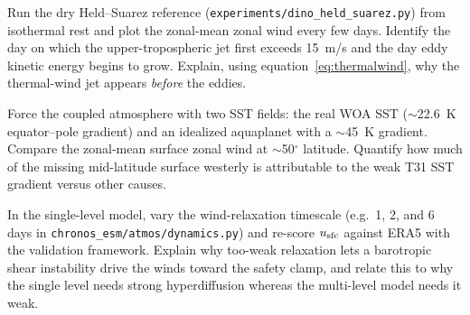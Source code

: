\begin{exercise}
Run the dry Held--Suarez reference (\texttt{experiments/dino\_held\_suarez.py}) from isothermal
rest and plot the zonal-mean zonal wind every few days. Identify the day on which the
upper-tropospheric jet first exceeds 15~m/s and the day eddy kinetic energy begins to grow.
Explain, using equation~\eqref{eq:thermalwind}, why the thermal-wind jet appears \emph{before}
the eddies.
\end{exercise}

\begin{exercise}
Force the coupled \dino{} atmosphere with two SST fields: the real WOA SST ($\sim$22.6~K
equator--pole gradient) and an idealized aquaplanet with a $\sim$45~K gradient. Compare the
zonal-mean surface zonal wind at $\sim$50$^\circ$ latitude. Quantify how much of the missing
mid-latitude surface westerly is attributable to the weak T31 SST gradient versus other causes.
\end{exercise}

\begin{exercise}
In the single-level model, vary the wind-relaxation timescale (e.g.\ 1, 2, and 6 days in
\texttt{chronos\_esm/atmos/dynamics.py}) and re-score $u_{\mathrm{sfc}}$ against ERA5 with the
validation framework. Explain why too-weak relaxation lets a barotropic shear instability drive
the winds toward the safety clamp, and relate this to why the single level needs strong
hyperdiffusion whereas the multi-level model needs it weak.
\end{exercise}
